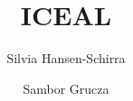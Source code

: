 \title{ICEAL}   
\author{Silvia Hansen-Schirra\and \newlineCover Sambor Grucza}
\renewcommand{\lsISBNdigital}{000-0-000000-00-0}
\renewcommand{\lsISBNhardcover}{000-0-000000-00-0}
\renewcommand{\lsISBNsoftcover}{000-0-000000-00-0}
\renewcommand{\lsSeries}{tmnlp}  
\renewcommand{\lsSeriesNumber}{5}
